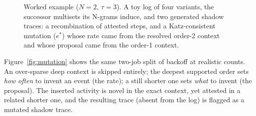 \documentclass[runningheads]{llncs}
\newcommand{\pend}{\ensuremath{p_{\mathit{end}}}}
\begin{document}
\begin{figure}[t]
\centering
{}
\caption{Worked example ($N{=}2$, $\tau{=}3$). A toy log of four variants, the successor multisets its N-grams induce, and two generated shadow traces: a recombination of attested steps, and a Katz-consistent mutation ($e^{*}$) whose rate came from the resolved order-2 context and whose proposal came from the order-1 context.}
\label{fig:example}
\end{figure}

Figure~\ref{fig:mutation} shows the same two-job split of backoff at realistic counts. An over-sparse deep context is skipped entirely; the deepest supported order sets \emph{how often} to invent an event (the rate); a still shorter one sets \emph{what} to invent (the proposal). The inserted activity is novel in the exact context, yet attested in a related shorter one, and the resulting trace (absent from the log) is flagged as a mutated shadow trace.
\end{document}
